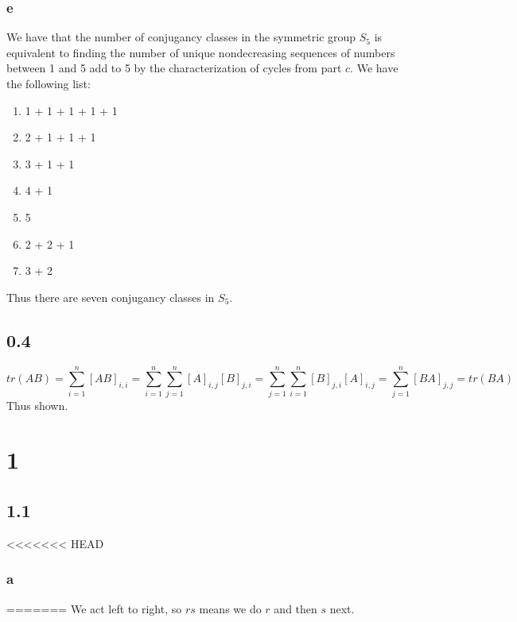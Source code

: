 \documentclass[]{article}
\begin{document}
\subsubsection*{e}
We have that the number of conjugancy classes in the symmetric group $S_5$ is equivalent to finding the number of unique nondecreasing sequences of numbers between 1 and 5 add to 5 by the characterization of cycles from part $c$.
We have the following list:
\begin{enumerate}
	\item 1 + 1 + 1 + 1 + 1
	\item 2 + 1 + 1 + 1
	\item 3 + 1 + 1
	\item 4 + 1
	\item 5
	\item 2 + 2 + 1
	\item 3 + 2
\end{enumerate}
Thus there are seven conjugancy classes in $S_5$.

\subsection*{0.4}
\begin{equation*}
tr(AB) = \sum_{i = 1}^n [AB]_{i,i} = \sum_{i = 1}^n \sum_{j = 1}^n [A]_{i,j} [B]_{j, i } = \sum_{j = 1}^n\sum_{i = 1}^n  [B]_{j, i }[A]_{i,j}   = \sum_{j = 1}^n [BA]_{j,j} = tr(BA)
\end{equation*}
Thus shown. 
\section*{1}
\subsection*{1.1}
<<<<<<< HEAD
\subsubsection{a}
=======
We act left to right, so $rs$ means we do $r$ and then $s$ next.
\end{document}
